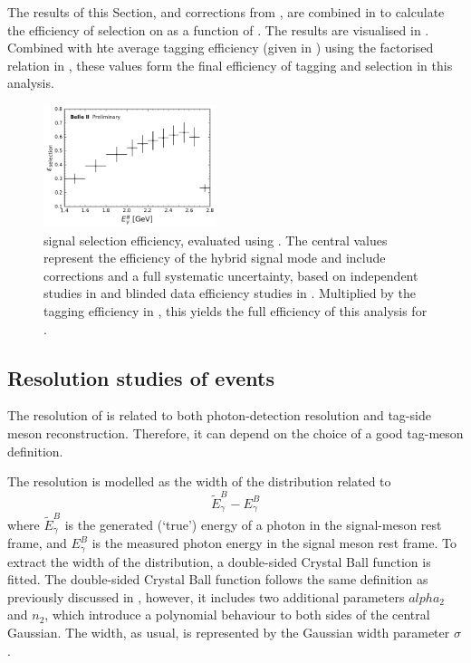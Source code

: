 The results of this Section,  and corrections from ,
are combined in  to calculate the efficiency of selection on \BtoXsgamma as a function of \EB.
The results are visualised in .
Combined with hte average \FEI tagging efficiency (given in ) using the factorised relation in , these values form the final
efficiency of tagging and \BtoXsgamma selection in this analysis.

\begin{figure}[htbp!]  
    \centering
    \includegraphics[width=0.45\textwidth]{figures/signal_validation/corrected_selection_efficiency.pdf}
    \caption{\label{fig:corrected_signal_efficiency} \BtoXsgamma signal selection efficiency, evaluated using .
    The central values represent the efficiency of the hybrid signal mode and include corrections and a full systematic uncertainty,
    based on independent studies in  and blinded data efficiency studies in .
    Multiplied by the \FEI tagging efficiency in , this yields the full efficiency of this analysis for \BtoXsgamma.
    }
\end{figure}

\subsection{Resolution studies of \texorpdfstring{\BtoXsgamma}{B->Xs gamma} events}\label{sec:resolution_studies}

The resolution of \EB is related to both photon-detection resolution and tag-side \B meson reconstruction.
Therefore, it can depend on the choice of a good tag-\B meson definition.

The resolution is modelled as the width of the distribution related to
\begin{equation}\label{eq:resolution}
    \tilde{E}_{\gamma}^{B} - E_{\gamma}^{B}
\end{equation}
where $\tilde{E}_{\gamma}^{B}$ is the generated (`true') energy of a photon in the signal-\B meson rest frame,
and $E_{\gamma}^{B}$ is the measured photon energy in the signal \B meson rest frame.
To extract the width of the distribution, a double-sided Crystal Ball function is fitted.
The double-sided Crystal Ball function follows the same definition as previously discussed in ,
however, it includes two additional parameters $alpha_2$ and $n_2$, which introduce a polynomial behaviour to both sides of the central Gaussian.
The width, as usual, is represented by the Gaussian width parameter $\sigma$.

